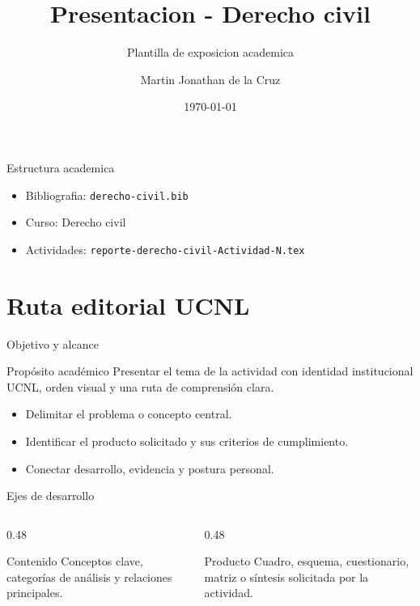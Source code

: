 ﻿\documentclass[spanish,aspectratio=169]{beamer}
\title{Presentacion - Derecho civil}
\subtitle{Plantilla de exposicion academica}
\author{Martin Jonathan de la Cruz}
\institute{Universidad Ciudadana de Nuevo Leon}
\date{\today}
\begin{document}
\begin{frame}
  \titlepage
\end{frame}

\begin{frame}{Estructura academica}
  \begin{itemize}
    \item Bibliografia: \texttt{derecho-civil.bib}
    \item Curso: Derecho civil
    \item Actividades: \texttt{reporte-derecho-civil-Actividad-N.tex}
  \end{itemize}
\end{frame}


\section{Ruta editorial UCNL}

\begin{frame}{Objetivo y alcance}
  \begin{block}{Propósito académico}
    Presentar el tema de la actividad con identidad institucional UCNL, orden visual y una ruta de comprensión clara.
  \end{block}
  \begin{itemize}
    \item Delimitar el problema o concepto central.
    \item Identificar el producto solicitado y sus criterios de cumplimiento.
    \item Conectar desarrollo, evidencia y postura personal.
  \end{itemize}
\end{frame}

\begin{frame}{Ejes de desarrollo}
  \begin{columns}[T,totalwidth=\textwidth]
    \begin{column}{0.48\textwidth}
      \begin{block}{Contenido}
        Conceptos clave, categorías de análisis y relaciones principales.
      \end{block}
    \end{column}
    \begin{column}{0.48\textwidth}
      \begin{block}{Producto}
        Cuadro, esquema, cuestionario, matriz o síntesis solicitada por la actividad.
      \end{block}
    \end{column}
  \end{columns}
\end{frame}
\end{document}
